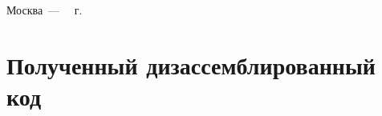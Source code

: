 \documentclass[a4paper,12pt]{article}
\begin{document}
\begin{center}
	\vfill
	Москва~---~\the\year
~г.
\end{center}
\clearpage


\section{Полученный дизассемблированный код}
\end{document}
